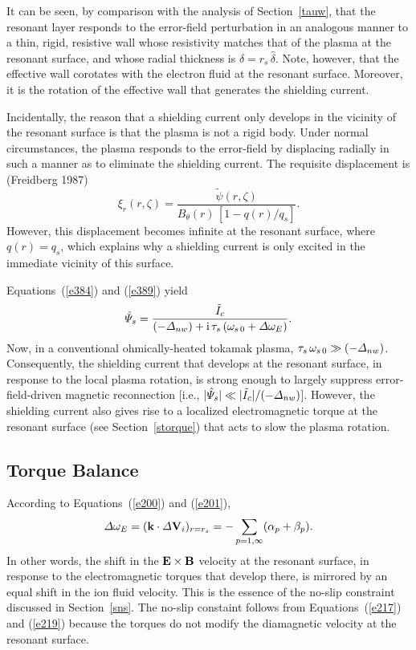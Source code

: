 \documentclass[notitlepage,12pt]{article}
\begin{document}
It can be seen, by comparison with the analysis of Section~\ref{tauw}, that the resonant layer responds to the error-field
perturbation in an analogous manner to a thin, rigid, resistive wall whose resistivity matches that of the plasma at the
resonant surface, and whose radial thickness is $\delta=r_s\,\hat{\delta}$. Note, however, that the effective wall corotates with the
electron fluid at the resonant surface. Moreover, it is the rotation of the effective wall that generates the shielding current. 

Incidentally, the reason that a shielding current only develops in the vicinity of the resonant surface is that the plasma is
not a rigid body. Under normal circumstances, the plasma responds to the error-field by displacing radially in such a
manner as to eliminate the shielding current. The requisite displacement is (Freidberg 1987)
\begin{equation}
\xi_r(r,\zeta) = \frac{\tilde{\psi}(r,\zeta)}{B_\theta(r)\,[1-q(r)/q_s]}.
\end{equation}
However, this displacement becomes infinite at the resonant surface, where $q(r)=q_s$, which explains why a shielding
current is only excited in the immediate vicinity of this surface. 

Equations~(\ref{e384}) and (\ref{e389}) yield
\begin{equation}\label{e392}
\hat{\mit\Psi}_s=\frac{\tilde{I}_c}{(-{\mit\Delta}_{nw})+ {\rm i}\,\tau_s\,(\omega_{s\,0}+ {\mit\Delta}\omega_E)}.
\end{equation}
Now, in a conventional ohmically-heated tokamak plasma, $\tau_s\,\omega_{s\,0}\gg (-{\mit\Delta}_{nw})$. Consequently, the
shielding current that develops at the resonant surface, in response to the local plasma rotation, is strong enough to largely
suppress error-field-driven magnetic reconnection [i.e., $|\hat{\mit\Psi}_s|\ll |\tilde{I}_c|/(-{\mit\Delta}_{nw})$]. However, the shielding current also gives rise to a localized electromagnetic
torque at the resonant surface (see Section~\ref{storque}) that acts to slow the plasma rotation. 

\subsection{Torque Balance}\label{stb}
According to Equations~(\ref{e200}) and (\ref{e201}),
\begin{equation}\label{e393}
{\mit\Delta}\omega_E = ({\bf k}\cdot{\mit\Delta}{\bf V}_i)_{r=r_s} = -\sum_{p=1,\infty}(\alpha_p+ \beta_p).
\end{equation}
In other words, the shift in the ${\bf E}\times {\bf B}$ velocity at the resonant surface, in response to the electromagnetic
torques that develop there, is mirrored by an equal  shift in the ion fluid velocity. This is the
essence of the no-slip constraint discussed in Section~\ref{sns}. The no-slip constaint follows from Equations~(\ref{e217}) and (\ref{e219})
because the torques do not modify the diamagnetic velocity at the resonant surface. 
\end{document}
